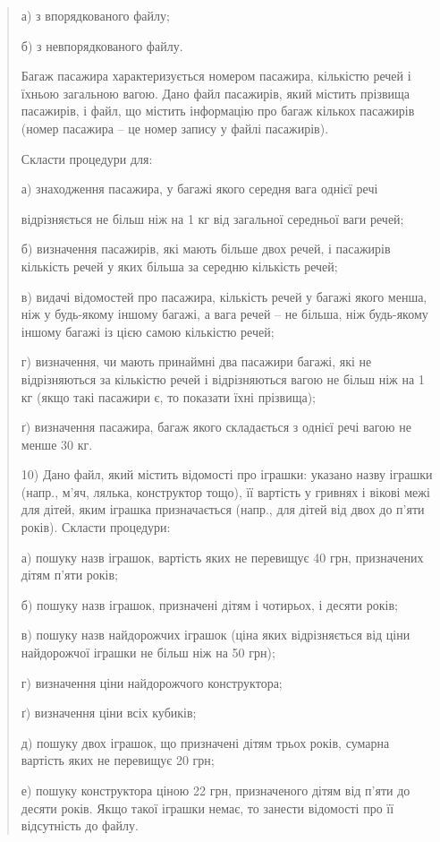 \documentclass[]{article}
\begin{document}
\begin{quote}
а) з впорядкованого файлу;

б) з невпорядкованого файлу.

Багаж пасажира характеризується номером пасажира, кількістю речей і
їхньою загальною вагою. Дано файл пасажирів, який містить прізвища
пасажирів, і файл, що містить інформацію про багаж кількох пасажирів
(номер пасажира -- це номер запису у файлі пасажирів).

Скласти процедури для:

а) знаходження пасажира, у багажі якого середня вага однієї речі

відрізняється не більш ніж на 1 кг від загальної середньої ваги речей;

б) визначення пасажирів, які мають більше двох речей, і пасажирів
кількість речей у яких більша за середню кількість речей;

в) видачі відомостей про пасажира, кількість речей у багажі якого менша,
ніж у будь-якому іншому багажі, а вага речей -- не більша, ніж
будь-якому іншому багажі із цією самою кількістю речей;

г) визначення, чи мають принаймні два пасажири багажі, які не
відрізняються за кількістю речей і відрізняються вагою не більш ніж на 1
кг (якщо такі пасажири є, то показати їхні прізвища);

ґ) визначення пасажира, багаж якого складається з однієї речі вагою не
менше 30 кг.

10) Дано файл, який містить відомості про іграшки: указано назву іграшки
(напр., м'яч, лялька, конструктор тощо), її вартість у гривнях і вікові
межі для дітей, яким іграшка призначається (напр., для дітей від двох до
п'яти років). Скласти процедури:

а) пошуку назв іграшок, вартість яких не перевищує 40 грн, призначених
дітям п'яти років;

б) пошуку назв іграшок, призначені дітям і чотирьох, і десяти років;

в) пошуку назв найдорожчих іграшок (ціна яких відрізняється від ціни
найдорожчої іграшки не більш ніж на 50 грн);

г) визначення ціни найдорожчого конструктора;

ґ) визначення ціни всіх кубиків;

д) пошуку двох іграшок, що призначені дітям трьох років, сумарна
вартість яких не перевищує 20 грн;

е) пошуку конструктора ціною 22 грн, призначеного дітям від п'яти до
десяти років. Якщо такої іграшки немає, то занести відомості про її
відсутність до файлу.


\end{quote}
\end{document}

